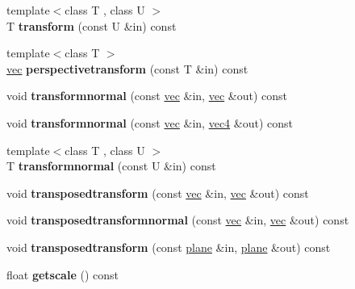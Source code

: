 \begin{DoxyCompactItemize}
{\footnotesize template$<$class T , class U $>$ }\\T {\bfseries transform} (const U \&in) const
\item 
\mbox{\label{structmatrix4_a6e233a27c52922cbd684d95864fc151e}} 
{\footnotesize template$<$class T $>$ }\\\hyperlink{structvec}{vec} {\bfseries perspectivetransform} (const T \&in) const
\item 
\mbox{\label{structmatrix4_ab7480b7527edfdcdaaacd65f1017844c}} 
void {\bfseries transformnormal} (const \hyperlink{structvec}{vec} \&in, \hyperlink{structvec}{vec} \&out) const
\item 
\mbox{\label{structmatrix4_a75e9092d4e89298da48aa074f23cf49a}} 
void {\bfseries transformnormal} (const \hyperlink{structvec}{vec} \&in, \hyperlink{structvec4}{vec4} \&out) const
\item 
\mbox{\label{structmatrix4_a107f01892a62fc4c4c33ab994dd5846c}} 
{\footnotesize template$<$class T , class U $>$ }\\T {\bfseries transformnormal} (const U \&in) const
\item 
\mbox{\label{structmatrix4_a55f147946a1c28154af6fe1c819f8e4e}} 
void {\bfseries transposedtransform} (const \hyperlink{structvec}{vec} \&in, \hyperlink{structvec}{vec} \&out) const
\item 
\mbox{\label{structmatrix4_a8c9304ee33d2835c12eb0b2d806134fe}} 
void {\bfseries transposedtransformnormal} (const \hyperlink{structvec}{vec} \&in, \hyperlink{structvec}{vec} \&out) const
\item 
\mbox{\label{structmatrix4_a18f61913b3faf3598431068abe512a99}} 
void {\bfseries transposedtransform} (const \hyperlink{structplane}{plane} \&in, \hyperlink{structplane}{plane} \&out) const
\item 
\mbox{\label{structmatrix4_a75cbcdef7ba0d76f7c9dfcbc262230c6}} 
float {\bfseries getscale} () const
\item 
\mbox{\label{structmatrix4_ad3b8cee87df355e6d0232787b00b69c5}} 

\end{DoxyCompactItemize}
